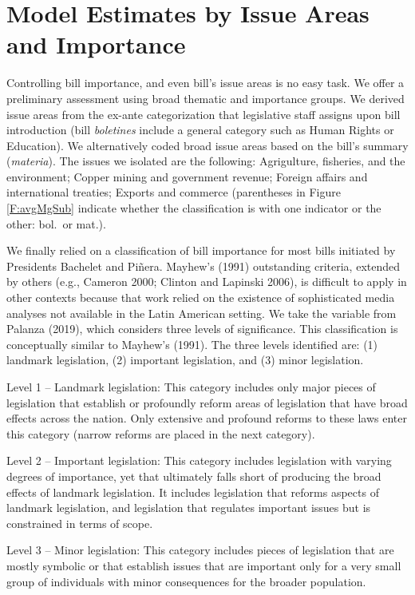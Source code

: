 \documentclass[letter,12pt]{article}
\begin{document}
  
\section{Model Estimates by Issue Areas and Importance}

Controlling bill importance, and even bill's issue areas is no easy task. We offer a preliminary assessment using broad thematic and importance groups. We derived issue areas from the ex-ante categorization that legislative staff assigns upon bill introduction (bill \emph{boletines} include a general category such as Human Rights or Education). We alternatively coded broad issue areas based on the bill's summary (\emph{materia}). The issues we isolated are the following: Agrigulture, fisheries, and the environment; Copper mining and government revenue; Foreign affairs and international treaties; Exports and commerce (parentheses in Figure \ref{F:avgMgSub} indicate whether the classification is with one indicator or the other: bol.\ or mat.). 

We finally relied on a classification of bill importance for most bills initiated by Presidents Bachelet and Piñera. Mayhew’s (1991) outstanding criteria, extended by others (e.g., Cameron 2000; Clinton and Lapinski 2006), is difficult to apply in other contexts because that work relied on the existence of sophisticated media analyses not available in the Latin American setting. We take the variable from Palanza (2019), which considers three levels of significance. This classification is conceptually similar to Mayhew's (1991). 
The three levels identified are: (1) landmark legislation, (2) important legislation, and (3) minor legislation. 

Level 1 – Landmark legislation: This category includes only major pieces of legislation that establish or profoundly reform areas of legislation that have broad effects across the nation. Only extensive and profound reforms to these laws enter this category (narrow reforms are placed in the next category). 

Level 2 – Important legislation: This category includes legislation with varying degrees of importance, yet that ultimately falls short of producing the broad effects of landmark legislation. It includes legislation that reforms aspects of landmark legislation, and legislation that regulates important issues but is constrained in terms of scope. 

Level 3 – Minor legislation: This category includes pieces of legislation that are mostly symbolic or that establish issues that are important only for a very small group of individuals with minor consequences for the broader population. 
\end{document}
